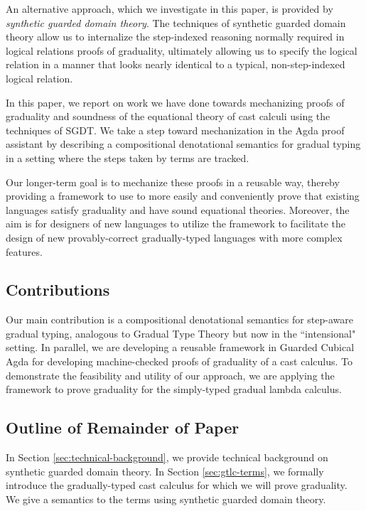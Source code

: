 An alternative approach, which we investigate in this paper, is provided by
\emph{synthetic guarded domain theory}.
The techniques of synthetic guarded domain theory allow us to internalize the
step-indexed reasoning normally required in logical relations proofs of graduality,
ultimately allowing us to specify the logical relation in a manner that looks nearly
identical to a typical, non-step-indexed logical relation.

In this paper, we report on work we have done towards mechanizing proofs of graduality
and soundness of the equational theory of cast calculi using the techniques of SGDT.
We take a step toward mechanization in the Agda proof assistant by describing a compositional
denotational semantics for gradual typing in a setting where the steps taken by terms are tracked.

Our longer-term goal is to mechanize these proofs in a reusable way, thereby providing a framework
to use to more easily and conveniently prove that existing languages satisfy graduality and have
sound equational theories. Moreover, the aim is for designers of new languages to utilize the
framework to facilitate the design of new provably-correct gradually-typed languages with more
complex features.


\subsection{Contributions}
Our main contribution is a compositional denotational semantics for step-aware gradual typing,
analogous to Gradual Type Theory but now in the ``intensional" setting.
In parallel, we are developing a reusable framework in
Guarded Cubical Agda for developing machine-checked proofs of graduality of a cast calculus.
To demonstrate the feasibility and utility of our approach, we are applying the framework
to prove graduality for the simply-typed gradual lambda calculus.


\subsection{Outline of Remainder of Paper}

%
In Section \ref{sec:technical-background}, we provide technical background on synthetic guarded domain theory.
% 
In Section \ref{sec:gtlc-terms}, we formally introduce the gradually-typed cast calculus
for which we will prove graduality. We give a semantics to the terms using
synthetic guarded domain theory.
%

